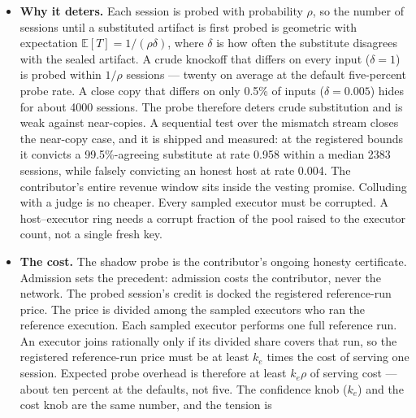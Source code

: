 \documentclass[11pt]{article}
\begin{document}
\begin{itemize}
committed answer are all bound by replay. The disputed input is
reproduced only into the sealed replay environment. The sealed
artifact decides. Whoever it contradicts pays the replay and
burns. Both roles carry the same slashable promise. A dispute is
filed with a deposit set at the registered reference-run price.
The deposit is deliberately bounded, so the dispute right is
affordable to any contributor. The loser pays the full replay
cost. The deviation burn is destroyed, never awarded to anyone.
A false claim has no upside. The disputed session's credit
escrows until the replay settles.
\item \textbf{Why it deters.} Each session is probed with
probability $\rho$, so the number of sessions until a substituted
artifact is first probed is geometric with expectation
$\mathbb{E}[T] = 1/(\rho\delta)$, where $\delta$ is how often the
substitute disagrees with the sealed artifact. A crude knockoff
that differs on every input ($\delta = 1$) is probed within
$1/\rho$ sessions --- twenty on average at the default
five-percent probe rate. A close copy that differs on only 0.5\%
of inputs ($\delta = 0.005$) hides for about 4000 sessions. The
probe therefore deters crude substitution and is weak against
near-copies. A sequential test over the mismatch stream closes
the near-copy case, and it is shipped and measured: at the
registered bounds it convicts a 99.5\%-agreeing substitute at
rate 0.958 within a median 2383 sessions, while falsely
convicting an honest host at rate 0.004. The
contributor's entire revenue window sits inside the vesting
promise. Colluding with a
judge is
no cheaper. Every sampled executor must be corrupted. A
host--executor ring needs a corrupt fraction of the pool raised
to the executor count, not a single fresh key.
\item \textbf{The cost.} The shadow probe is the contributor's
ongoing honesty certificate. Admission sets the precedent: admission costs
the contributor, never the network. The probed session's credit
is docked the registered reference-run price. The price is
divided among the sampled executors who ran the reference
execution. Each sampled executor performs one full reference run.
An executor joins rationally only if its divided share covers
that run, so the registered reference-run price must be at least
$k_e$ times the cost of serving one session. Expected probe
overhead is therefore at least $k_e\rho$ of serving cost --- about
ten percent at the defaults, not five. The confidence knob
($k_e$) and the cost knob are the same number, and the tension is

\end{itemize}
\end{document}
